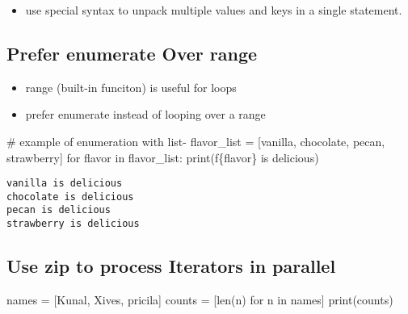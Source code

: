 \documentclass[
]{report}
\newenvironment{Shaded}{\begin{snugshade}}{\end{snugshade}}
\newcommand{\BuiltInTok}[1]{\textcolor[rgb]{0.00,0.23,0.31}{#1}}
\newcommand{\CommentTok}[1]{\textcolor[rgb]{0.37,0.37,0.37}{#1}}
\newcommand{\ControlFlowTok}[1]{\textcolor[rgb]{0.00,0.23,0.31}{#1}}
\newcommand{\KeywordTok}[1]{\textcolor[rgb]{0.00,0.23,0.31}{#1}}
\newcommand{\NormalTok}[1]{\textcolor[rgb]{0.00,0.23,0.31}{#1}}
\newcommand{\OperatorTok}[1]{\textcolor[rgb]{0.37,0.37,0.37}{#1}}
\newcommand{\SpecialCharTok}[1]{\textcolor[rgb]{0.37,0.37,0.37}{#1}}
\newcommand{\SpecialStringTok}[1]{\textcolor[rgb]{0.13,0.47,0.30}{#1}}
\newcommand{\StringTok}[1]{\textcolor[rgb]{0.13,0.47,0.30}{#1}}
\providecommand{\tightlist}{%
  \setlength{\itemsep}{0pt}\setlength{\parskip}{0pt}}\usepackage{longtable,booktabs,array}
\begin{document}
\begin{itemize}
\tightlist
\item
  use special syntax to unpack multiple values and keys in a single
  statement.
\end{itemize}

\hypertarget{prefer-enumerate-over-range}{%
\subsection{Prefer enumerate Over
range}\label{prefer-enumerate-over-range}}

\begin{itemize}
\tightlist
\item
  range (built-in funciton) is useful for loops
\item
  prefer enumerate instead of looping over a range
\end{itemize}

\begin{Shaded}
\begin{Highlighting}[]
\CommentTok{\# example of enumeration with list{-} }
\NormalTok{flavor\_list }\OperatorTok{=}\NormalTok{ [}\StringTok{\textquotesingle{}vanilla\textquotesingle{}}\NormalTok{, }\StringTok{\textquotesingle{}chocolate\textquotesingle{}}\NormalTok{, }\StringTok{\textquotesingle{}pecan\textquotesingle{}}\NormalTok{, }\StringTok{\textquotesingle{}strawberry\textquotesingle{}}\NormalTok{]}
\ControlFlowTok{for}\NormalTok{ flavor }\KeywordTok{in}\NormalTok{ flavor\_list:}
    \BuiltInTok{print}\NormalTok{(}\SpecialStringTok{f\textquotesingle{}}\SpecialCharTok{\{}\NormalTok{flavor}\SpecialCharTok{\}}\SpecialStringTok{ is delicious\textquotesingle{}}\NormalTok{)}
\end{Highlighting}
\end{Shaded}

\begin{verbatim}
vanilla is delicious
chocolate is delicious
pecan is delicious
strawberry is delicious
\end{verbatim}

\hypertarget{use-zip-to-process-iterators-in-parallel}{%
\subsection{Use zip to process Iterators in
parallel}\label{use-zip-to-process-iterators-in-parallel}}

\begin{Shaded}
\begin{Highlighting}[]
\NormalTok{names }\OperatorTok{=}\NormalTok{ [}\StringTok{\textquotesingle{}Kunal\textquotesingle{}}\NormalTok{, }\StringTok{\textquotesingle{}Xives\textquotesingle{}}\NormalTok{, }\StringTok{\textquotesingle{}pricila\textquotesingle{}}\NormalTok{]}
\NormalTok{counts }\OperatorTok{=}\NormalTok{ [}\BuiltInTok{len}\NormalTok{(n) }\ControlFlowTok{for}\NormalTok{ n }\KeywordTok{in}\NormalTok{ names]}
\BuiltInTok{print}\NormalTok{(counts)}
\end{Highlighting}
\end{Shaded}
\end{document}
